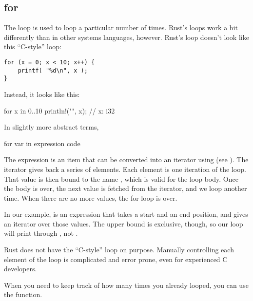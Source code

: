 \subsection*{for}

The  loop is used to loop a particular number of times. Rust's  loops work a bit differently than in other 
systems languages, however. Rust's  loop doesn't look like this “C-style”  loop:

\begin{verbatim}
for (x = 0; x < 10; x++) {
    printf( "%d\n", x );
}
\end{verbatim}

Instead, it looks like this:

\begin{rustc}
for x in 0..10 {
    println!("{}", x); // x: i32
}
\end{rustc}

In slightly more abstract terms,

\begin{rustc}
for var in expression {
    code
}
\end{rustc}

The expression is an item that can be converted into an iterator using 
\href{https://doc.rust-lang.org/std/iter/trait.IntoIterator.html\{IntoIterator} (see ). The iterator 
gives back a series of elements. Each element is one iteration of the loop. That value is then bound to the name , which is 
valid for the loop body. Once the body is over, the next value is fetched from the iterator, and we loop another time. When there are 
no more values, the for loop is over.

\blank

In our example,  is an expression that takes a start and an end position, and gives an iterator over those values. 
The upper bound is exclusive, though, so our loop will print  through , not .

\blank

Rust does not have the “C-style”  loop on purpose. Manually controlling each element of the loop is complicated and 
error prone, even for experienced C developers.


When you need to keep track of how many times you already looped, you can use the  function.



